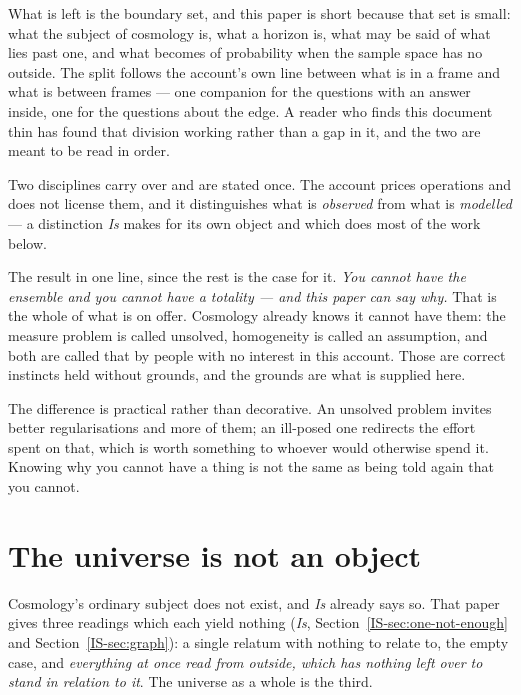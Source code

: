 \documentclass[11pt,a4paper]{article}
\theoremstyle{remark}\newtheorem{remark}[definition]{Remark}
\begin{document}
What is left is the boundary set, and this paper is short because that set is small: what the
subject of cosmology is, what a horizon is, what may be said of what lies past one, and what becomes of
probability when the sample space has no outside. The split follows the account's own line between
what is in a frame and what is between frames --- one companion for the questions with an answer
inside, one for the questions about the edge. A reader who finds this document thin has found that
division working rather than a gap in it, and the two are meant to be read in order.

Two disciplines carry over and are stated once. The account prices operations and does not
license them, and it distinguishes what is \emph{observed} from what is \emph{modelled} --- a
distinction \emph{Is} makes for its own object and which does most of the work below.

The result in one line, since the rest is the case for it. \emph{You cannot have the ensemble and
you cannot have a totality --- and this paper can say why.} That is the whole of what is on offer.
Cosmology already knows it cannot have them: the measure problem is called unsolved, homogeneity is
called an assumption, and both are called that by people with no interest in this account. Those
are correct instincts held without grounds, and the grounds are what is supplied here.

The difference is practical rather than decorative. An unsolved problem invites better
regularisations and more of them; an ill-posed one redirects the effort spent on that, which is
worth something to whoever would otherwise spend it. Knowing why you cannot have a thing is not the same
as being told again that you cannot.

\section{The universe is not an object}\label{sec:not-an-object}
Cosmology's ordinary subject does not exist, and \emph{Is} already says so. That paper gives
three readings which each yield nothing (\emph{Is}, Section~\ref{IS-sec:one-not-enough} and
Section~\ref{IS-sec:graph}): a single relatum with nothing to relate to, the empty case, and
\emph{everything at once read from outside, which has nothing left over to stand in relation to it}. The
universe as a whole is the third.
\end{document}
